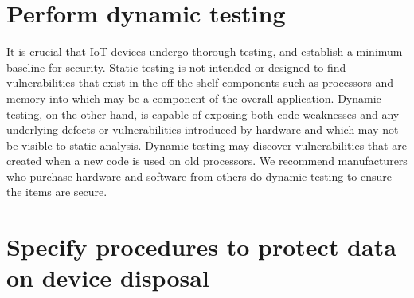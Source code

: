 \documentclass[12pt]{report}
\begin{document}
\section{Perform dynamic testing}

It is crucial that IoT devices undergo thorough testing, and establish a 
minimum baseline for security. Static testing is not intended or designed 
to find vulnerabilities that exist in the off-the-shelf components such as 
processors and memory into which may be a component of the overall application. 
Dynamic testing, on the other hand, is capable of exposing both code weaknesses 
and any underlying defects or vulnerabilities introduced by hardware and which may 
not be visible to static analysis. Dynamic testing may discover vulnerabilities that 
are created when a new code is used on old processors. We recommend manufacturers 
who purchase hardware and software from others do dynamic testing to ensure the 
items are secure.

\section{Specify procedures to protect data on device disposal}
\end{document}

